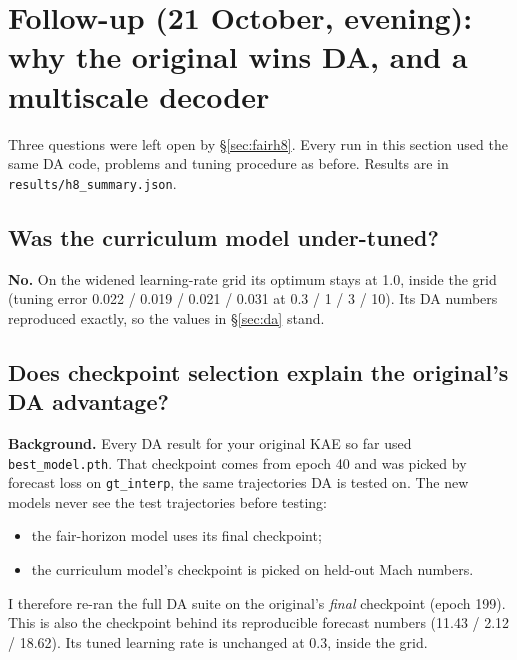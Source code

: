 \section{Follow-up (21 October, evening): why the original wins DA, and a multiscale decoder}\label{sec:round3}

Three questions were left open by \S\ref{sec:fairh8}. Every run in this section used the same DA
code, problems and tuning procedure as before. Results are in
\texttt{results/h8\_summary.json}.

\subsection{Was the curriculum model under-tuned?}

\textbf{No.} On the widened learning-rate grid its optimum stays at 1.0, inside the grid
(tuning error 0.022 / 0.019 / 0.021 / 0.031 at 0.3 / 1 / 3 / 10). Its DA numbers reproduced
exactly, so the values in \S\ref{sec:da} stand.

\subsection{Does checkpoint selection explain the original's DA advantage?}\label{sec:selection}

\textbf{Background.} Every DA result for your original KAE so far used
\texttt{best\_model.pth}. That checkpoint comes from epoch 40 and was picked by forecast loss
on \texttt{gt\_interp}, the same trajectories DA is tested on. The new models never see the
test trajectories before testing:
\begin{itemize}
\item the fair-horizon model uses its final checkpoint;
\item the curriculum model's checkpoint is picked on held-out Mach numbers.
\end{itemize}
I therefore re-ran the full DA suite on the original's \emph{final} checkpoint (epoch 199).
This is also the checkpoint behind its reproducible forecast numbers (11.43 / 2.12 / 18.62).
Its tuned learning rate is unchanged at 0.3, inside the grid.

